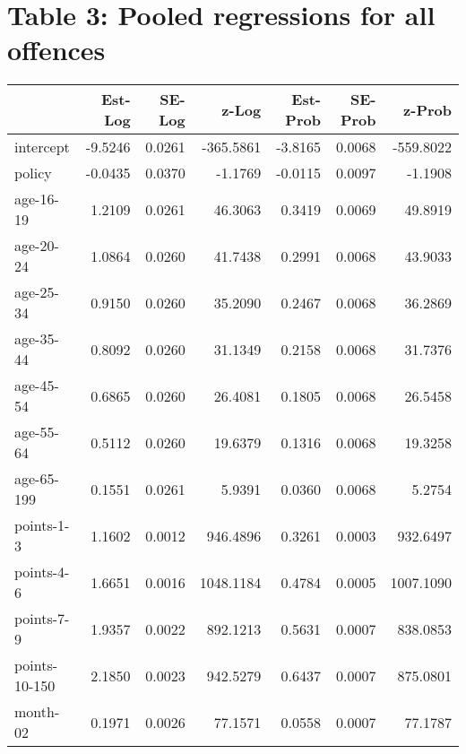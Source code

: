 \documentclass[10pt]{article}
\begin{document}






\section{Table 3: Pooled regressions for all offences}




\begin{table}[ht]
\centering
\begin{tabular}{lrrrrrr}
  \hline
 & Est-Log & SE-Log & z-Log & Est-Prob & SE-Prob & z-Prob \\ 
  \hline
intercept & -9.5246 & 0.0261 & -365.5861 & -3.8165 & 0.0068 & -559.8022 \\ 
  policy & -0.0435 & 0.0370 & -1.1769 & -0.0115 & 0.0097 & -1.1908 \\ 
  age-16-19 & 1.2109 & 0.0261 & 46.3063 & 0.3419 & 0.0069 & 49.8919 \\ 
  age-20-24 & 1.0864 & 0.0260 & 41.7438 & 0.2991 & 0.0068 & 43.9033 \\ 
  age-25-34 & 0.9150 & 0.0260 & 35.2090 & 0.2467 & 0.0068 & 36.2869 \\ 
  age-35-44 & 0.8092 & 0.0260 & 31.1349 & 0.2158 & 0.0068 & 31.7376 \\ 
  age-45-54 & 0.6865 & 0.0260 & 26.4081 & 0.1805 & 0.0068 & 26.5458 \\ 
  age-55-64 & 0.5112 & 0.0260 & 19.6379 & 0.1316 & 0.0068 & 19.3258 \\ 
  age-65-199 & 0.1551 & 0.0261 & 5.9391 & 0.0360 & 0.0068 & 5.2754 \\ 
  points-1-3 & 1.1602 & 0.0012 & 946.4896 & 0.3261 & 0.0003 & 932.6497 \\ 
  points-4-6 & 1.6651 & 0.0016 & 1048.1184 & 0.4784 & 0.0005 & 1007.1090 \\ 
  points-7-9 & 1.9357 & 0.0022 & 892.1213 & 0.5631 & 0.0007 & 838.0853 \\ 
  points-10-150 & 2.1850 & 0.0023 & 942.5279 & 0.6437 & 0.0007 & 875.0801 \\ 
  month-02 & 0.1971 & 0.0026 & 77.1571 & 0.0558 & 0.0007 & 77.1787 \\ 

\end{tabular}
\end{table}
\end{document}
